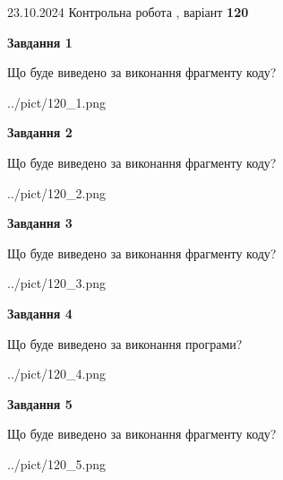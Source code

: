 \documentclass[12pt, ukrainian]{article}
\begin{document}
{\Large{23.10.2024 Контрольна робота , варіант  \No \textbf { 120 }\par}}
{
\begin {large}
{\begin {center}\textbf{Завдання 1}\end {center}}

Що буде виведено за виконання фрагменту коду?\par
\begin{center}
	{../pict/120_1.png}
\end{center}
\newpage

{\begin {center}\textbf{Завдання 2}\end {center}}

Що буде виведено за виконання фрагменту коду?\par
\begin{center}
	{../pict/120_2.png}
\end{center}
\newpage

{\begin {center}\textbf{Завдання 3}\end {center}}

Що буде виведено за виконання фрагменту коду?\par
\begin{center}
	{../pict/120_3.png}
\end{center}
\newpage

{\begin {center}\textbf{Завдання 4}\end {center}}

Що буде виведено за виконання програми?\par
\begin{center}
	{../pict/120_4.png}
\end{center}
\newpage

{\begin {center}\textbf{Завдання 5}\end {center}}

Що буде виведено за виконання фрагменту коду?\par
\begin{center}
	{../pict/120_5.png}
\end{center}
\newpage


\end{large}}
\end{document}
